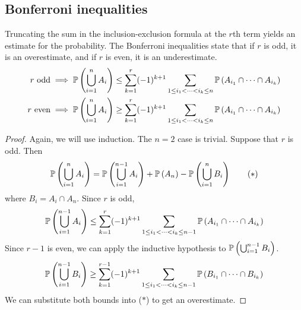 \subsection{Bonferroni inequalities}
Truncating the sum in the inclusion-exclusion formula at the \(r\)th term yields an estimate for the probability.
The Bonferroni inequalities state that if \(r\) is odd, it is an overestimate, and if \(r\) is even, it is an underestimate.
\begin{align*}
	r \text{ odd}  & \implies \mathbb{P}\left({\bigcup_{i=1}^n A_i}\right) \leq \sum_{k=1}^r (-1)^{k+1} \sum_{1 \leq i_1 < \dots < i_k \leq n} \mathbb{P}\left({A_{i_1} \cap \dots \cap A_{i_k}}\right) \\
	r \text{ even} & \implies \mathbb{P}\left({\bigcup_{i=1}^n A_i}\right) \geq \sum_{k=1}^r (-1)^{k+1} \sum_{1 \leq i_1 < \dots < i_k \leq n} \mathbb{P}\left({A_{i_1} \cap \dots \cap A_{i_k}}\right)
\end{align*}
\begin{proof}
	Again, we will use induction.
	The \(n=2\) case is trivial.
	Suppose that \(r\) is odd.
	Then
	\begin{equation}
		\mathbb{P}\left({\bigcup_{i=1}^n A_i}\right) = \mathbb{P}\left({\bigcup_{i=1}^{n-1} A_i}\right) + \mathbb{P}\left({A_n}\right) - \mathbb{P}\left({\bigcup_{i=1}^n B_i}\right) \tag{\(\ast\)}
	\end{equation}
	where \(B_i = A_i \cap A_n\).
	Since \(r\) is odd,
	\[
		\mathbb{P}\left({\bigcup_{i=1}^{n-1} A_i}\right) \leq \sum_{k=1}^r (-1)^{k+1} \sum_{1 \leq i_1 < \dots < i_k \leq n-1} \mathbb{P}\left({A_{i_1} \cap \dots \cap A_{i_k}}\right)
	\]
	Since \(r-1\) is even, we can apply the inductive hypothesis to \(\mathbb{P}\left({\bigcup_{i=1}^{n-1} B_i}\right)\).
	\[
		\mathbb{P}\left({\bigcup_{i=1}^{n-1} B_i}\right) \geq \sum_{k=1}^{r-1} (-1)^{k+1} \sum_{1 \leq i_1 < \dots < i_k \leq n-1} \mathbb{P}\left({B_{i_1} \cap \dots \cap B_{i_k}}\right)
	\]
	We can substitute both bounds into (\(\ast\)) to get an overestimate.
\end{proof}

